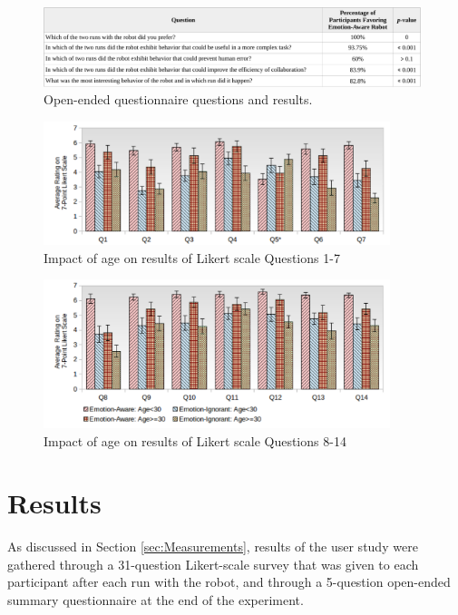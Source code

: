 \documentclass{sig-alternate-05-2015}
\begin{document}
\begin{figure}[tbh]
\centering
\includegraphics[width=0.98\textwidth]{figure/table2-croped.pdf}
\caption{Open-ended questionnaire questions and results.}
\label{fig:Open-Ended-Table}
\label{fig:14Questions}
\vspace*{-5mm}
\end{figure}

\begin{figure}[tbh]
\centering
\includegraphics[width=0.9\textwidth]{figure/AgeComparison1.pdf}
\caption{Impact of age on results of Likert scale Questions 1-7}
\end{figure}

\begin{figure}[tbh]
\centering
\includegraphics[width=0.9\textwidth]{figure/AgeComparison2.pdf}
\caption{Impact of age on results of Likert scale Questions 8-14}
\end{figure}

\vspace*{-3mm}
\section{Results}

As discussed in Section \ref{sec:Measurements}, results of the user study were
gathered through a 31-question Likert-scale survey that was given to each participant
after each run with the robot, and through a 5-question open-ended summary
questionnaire at the end of the experiment.
\end{document}
